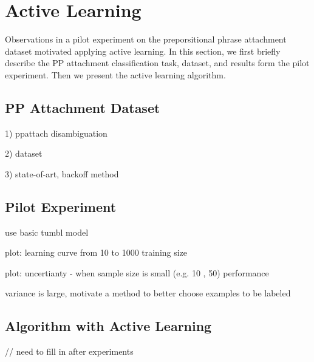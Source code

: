 \section{Active Learning}


Observations in a pilot experiment on the
preporsitional phrase attachment dataset motivated applying 
active learning.
In this section, we first briefly describe the PP
attachment classification task, dataset, and results form the pilot experiment.
Then we present the active learning algorithm.

\subsection{PP Attachment Dataset}\label{ppdata}

1) ppattach disambiguation

2) dataset

3) state-of-art, backoff method

\subsection{Pilot Experiment}

use basic tumbl model

plot: learning curve from 10 to 1000 training size 

plot: uncertianty - when sample size is small (e.g. 10 , 50) performance

variance is large, motivate a method to better choose examples to be labeled


\subsection{Algorithm with Active Learning}

// need to fill in after experiments

